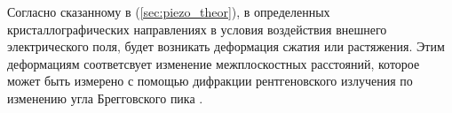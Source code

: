 
Согласно сказанному в (\ref{sec:piezo_theor}), в определенных кристаллографических направлениях в
условия воздействия внешнего электрического поля, будет возникать деформация
сжатия или растяжения. Этим деформациям соответсвует изменение межплоскостных
 расстояний, которое может быть измерено с помощью дифракции рентгеновского
 излучения по изменению угла Брегговского пика \cite{marchenkov2014}.
